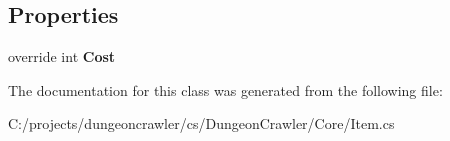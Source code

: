 \subsection*{Properties}
\begin{DoxyCompactItemize}
\item 
\hypertarget{class_dungeon_crawler_1_1_core_1_1_weapon_a2a4b8d41a1a3d9acf71ac55ccbf4556c}{}override int {\bfseries Cost}\label{class_dungeon_crawler_1_1_core_1_1_weapon_a2a4b8d41a1a3d9acf71ac55ccbf4556c}

\end{DoxyCompactItemize}


The documentation for this class was generated from the following file\+:\begin{DoxyCompactItemize}
\item 
C\+:/projects/dungeoncrawler/cs/\+Dungeon\+Crawler/\+Core/Item.\+cs\end{DoxyCompactItemize}
